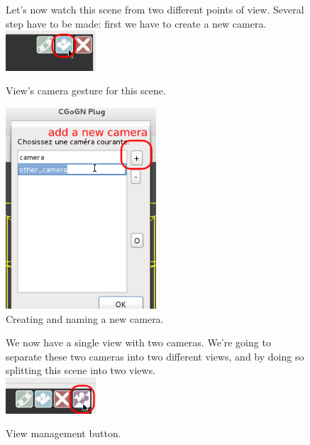 \documentclass[a4paper]{scrreprt}
\begin{document}
	\begin{figure}[h!p]
	Let's now watch this scene from two different points of view. Several step have
	to be made: first we have to create a new camera.\\
	  \centering
	    \includegraphics[width=0.3\textwidth]{images/screenshot7}
	  \caption{View's camera gesture for this scene.}
	\end{figure}
	\begin{figure}[h!p]
	  \centering
	    \includegraphics[width=0.5\textwidth]{images/screenshot8}
	  \caption{Creating and naming a new camera.}
	\end{figure}
	\begin{figure}[h!p]
		We now have a single view with two cameras. We're going to separate these two
		cameras into two different views, and by doing so splitting this scene into
		two views.\\
	  \centering
	    \includegraphics[width=0.3\textwidth]{images/screenshot9}
	  \caption{View management button.}
	\end{figure}
\end{document}
